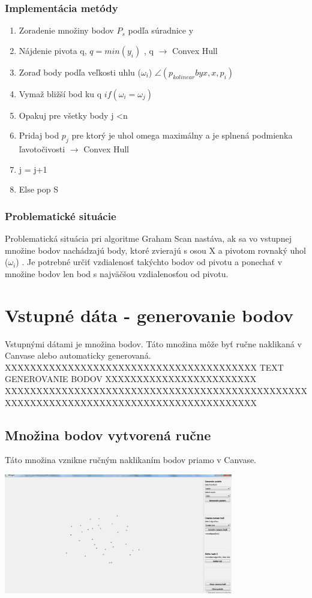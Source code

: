 \documentclass[12pt]{article}
\begin{document}
\subsubsection{Implementácia metódy}
\begin{enumerate}
	\item Zoradenie množiny bodov $P_s$ podľa súradnice y 
	\item Nájdenie pivota q, $ q = min(y_i)$ , q $\to$ Convex Hull
	\item Zoraď body podľa veľkosti uhlu  ($\omega_i$) $ \angle(p_{kolinear} by x, x, p_i)$
	\item Vymaž bližší bod ku q $ if(\omega_i = \omega_j) $
	\item Opakuj pre všetky body j \textless  n
	\item Pridaj bod $p_j$ pre ktorý je uhol omega maximálny a je splnená podmienka ľavotočivosti  $\to$ Convex Hull
	\item \hspace {1.5cm} j = j+1
	\item Else pop S	
\end{enumerate}
\subsubsection{Problematické situácie}
Problematická situácia pri algoritme Graham Scan nastáva, ak sa vo vstupnej množine bodov nachádzajú body, ktoré zvierajú s osou X a pivotom rovnaký uhol ($\omega_i$) . Je potrebné určiť vzdialenosť takýchto bodov od pivotu a ponechať v množine bodov len bod s najväčšou vzdialenosťou od pivotu.
\clearpage 
\section{Vstupné dáta - generovanie bodov}
Vstupnými dátami je množina bodov. Táto množina môže byť ručne naklikaná v Canvase alebo automaticky generovaná.
XXXXXXXXXXXXXXXXXXXXXXXXXXXXXXXXXXXXXXXX TEXT GENEROVANIE BODOV XXXXXXXXXXXXXXXXXXXXXXXX
XXXXXXXXXXXXXXXXXXXXXXXXXXXXXXXXXXXXXXXXXXXXXXXXXXXXXXXXXXXXXXXXXXXXXXXXXXXXXXXXXXXXXXXX

\subsection{Množina bodov vytvorená ručne}
Táto množina vznikne ručným naklikaním bodov priamo v Canvase.

\begin{center}
   \includegraphics[width=10cm]{./img/points_manual.png}
\end{center}
\end{document}
